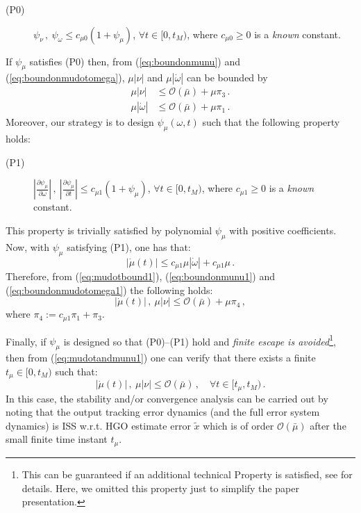\documentclass[letterpaper, 10 pt, conference]{ieeeconf}  %
\theoremstyle{plain}
\theoremstyle{definition}
\theoremstyle{remark}
\begin{document}
\medskip
%
\begin{description}
\item[(P0)] $\psi_\nu\,, \
\psi_\omega \leq c_{\mu 0}(1+\psi_\mu)$, $\forall t \in [0,t_M)$,
where $c_{\mu 0}\geq 0$ is a {\em known} constant.
\end{description}
%
\medskip

If  $\psi_\mu$ satisfies (P0) then, from (\ref{eq:boundonmunu})
and (\ref{eq:boundonmudotomega}), $\mu|\nu|$ and
$\mu|\dot{\omega}|$ can be bounded by
%
\begin{align}
\mu|\nu| &\leq
\mathcal{O}(\bar{\mu})+\mu\pi_3\,.\label{eq:boundonmunu1}\\
\mu|\dot{\omega}| &\leq
\mathcal{O}(\bar{\mu})+\mu\pi_1\,.\label{eq:boundonmudotomega1}
\end{align}
%
Moreover, our strategy is to design $\psi_\mu(\omega,t)$ such that the
following  property holds:

\medskip
%
\begin{description}
\item[(P1)] $\left|\frac{\partial \psi_\mu}{\partial
\omega}\right|\,, \ \left|\frac{\partial \psi_\mu}{\partial
t}\right|\leq c_{\mu 1}(1+\psi_\mu)$, $\forall t \in [0,t_M)$, where
$c_{\mu 1}\geq 0$ is a {\em known} constant.
\end{description}
%
\medskip

This property is trivially satisfied by polynomial $\psi_\mu$ with
positive coefficients. Now, with $\psi_\mu$ satisfying (P1), one has that:
%
\begin{equation}
|\dot{\mu}(t)|\!\leq\!c_{\mu 1} \mu |\dot{\omega}|+c_{\mu 1}
\mu\,. \label{eq:mudotbound1}
\end{equation}
%
Therefore, from (\ref{eq:mudotbound1}), (\ref{eq:boundonmunu1})
and (\ref{eq:boundonmudotomega1}) the following holds:
%
\begin{equation}
|\dot{\mu}(t)|\,, \ \mu|\nu| \leq \mathcal{O}(\bar{\mu}) + \mu
\pi_4\,, \label{eq:mudotandmunu1}
\end{equation}
%
where $\pi_4:=c_{\mu 1} \pi_1 +\pi_3$.

Finally, if $\psi_\mu$ is designed so that (P0)--(P1) hold and {\em finite escape is avoided}\footnote{This can be guaranteed if an additional technical Property is satisfied, see \cite{POH:2011} for details. Here, we omitted this property just to simplify the paper presentation.}, then
from (\ref{eq:mudotandmunu1})  one can verify
that there exists a finite $t_\mu \in [0,t_M)$ such that:
%
\begin{equation}
|\dot{\mu}(t)|\,, \ \mu |\nu| \leq \mathcal{O}(\bar{\mu})\,, \quad
\forall t \in [t_\mu,t_M)\,. \label{eq:mudotmunu1}
\end{equation}
%
In this case, the stability and/or convergence analysis  can be carried out by noting that the output tracking error dynamics (and the full error system dynamics) is ISS w.r.t. HGO estimate error $\tilde{x}$ which is of order $\mathcal{O}(\bar{\mu})$ after the small finite time instant $t_\mu$.
\end{document}
